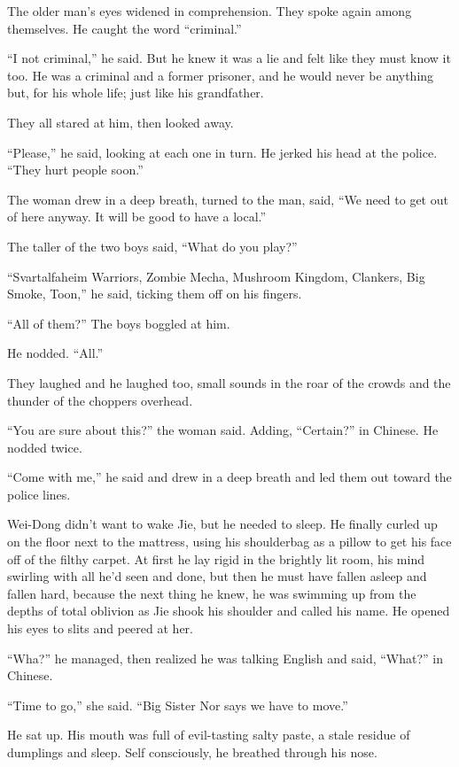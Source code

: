 The older man's eyes widened in comprehension. They spoke again
among themselves. He caught the word ``criminal.''

``I not criminal,'' he said. But he knew it was a lie and felt like
they must know it too. He was a criminal and a former prisoner, and
he would never be anything but, for his whole life; just like his
grandfather.

They all stared at him, then looked away.

``Please,'' he said, looking at each one in turn. He jerked his head
at the police. ``They hurt people soon.''

The woman drew in a deep breath, turned to the man, said, ``We need
to get out of here anyway. It will be good to have a local.''

The taller of the two boys said, ``What do you play?''

``Svartalfaheim Warriors, Zombie Mecha, Mushroom Kingdom, Clankers,
Big Smoke, Toon,'' he said, ticking them off on his fingers.

``All of them?'' The boys boggled at him.

He nodded. ``All.''

They laughed and he laughed too, small sounds in the roar of the
crowds and the thunder of the choppers overhead.

``You are sure about this?'' the woman said. Adding, ``Certain?'' in
Chinese. He nodded twice.

``Come with me,'' he said and drew in a deep breath and led them out
toward the police lines.

\tb

Wei-Dong didn't want to wake Jie, but he needed to sleep. He
finally curled up on the floor next to the mattress, using his
shoulderbag as a pillow to get his face off of the filthy carpet.
At first he lay rigid in the brightly lit room, his mind swirling
with all he'd seen and done, but then he must have fallen asleep
and fallen hard, because the next thing he knew, he was swimming up
from the depths of total oblivion as Jie shook his shoulder and
called his name. He opened his eyes to slits and peered at her.

``Wha?'' he managed, then realized he was talking English and said,
``What?'' in Chinese.

``Time to go,'' she said. ``Big Sister Nor says we have to move.''

He sat up. His mouth was full of evil-tasting salty paste, a stale
residue of dumplings and sleep. Self consciously, he breathed
through his nose.

